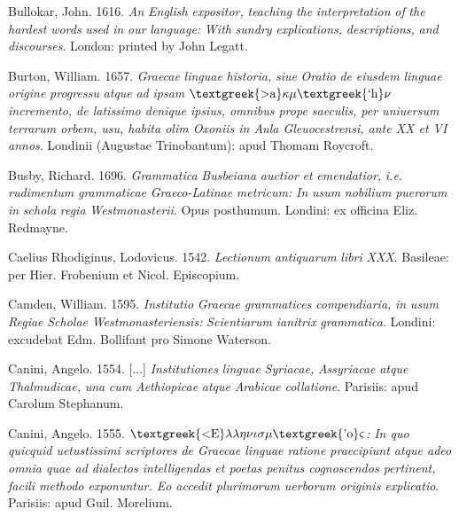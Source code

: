 Bullokar, John. 1616. \textit{An} \textit{English} \textit{expositor,} \textit{teaching} \textit{the} \textit{interpretation} \textit{of} \textit{the} \textit{hardest} \textit{words} \textit{used} \textit{in} \textit{our} \textit{language:} \textit{With} \textit{sundry} \textit{explications,} \textit{descriptions,} \textit{and} \textit{discourses}. London: printed by John Legatt.

Burton, William. 1657. \textit{Graecae} \textit{linguae} \textit{historia,} \textit{siue} \textit{Oratio} \textit{de} \textit{eiusdem} \textit{linguae} \textit{origine} \textit{progressu} \textit{atque} \textit{ad} \textit{ipsam} \textit{$\text{\textgreek{>a}}\kappa \mu \text{\textgreek{`h}}\nu $ incremento, de latissimo denique ipsius, omnibus prope saeculis, per uniuersum terrarum orbem, usu, habita olim Oxoniis in Aula Gleuocestrensi, ante XX et VI annos}. Londinii (Augustae Trinobantum): apud Thomam Roycroft.

Busby, Richard. 1696. \textit{Grammatica} \textit{Busbeiana} \textit{auctior} \textit{et} \textit{emendatior,} \textit{i.e.} \textit{rudimentum} \textit{grammaticae} \textit{Graeco-Latinae} \textit{metricum:} \textit{In} \textit{usum} \textit{nobilium} \textit{puerorum} \textit{in} \textit{schola} \textit{regia} \textit{Westmonasterii}. Opus posthumum. Londini: ex officina Eliz. Redmayne.

Caelius Rhodiginus, Lodovicus. 1542. \textit{Lectionum} \textit{antiquarum} \textit{libri} \textit{XXX}. Basileae: per Hier. Frobenium et Nicol. Episcopium.

Camden, William. 1595. \textit{Institutio} \textit{Graecae} \textit{grammatices} \textit{compendiaria,} \textit{in} \textit{usum} \textit{Regiae} \textit{Scholae} \textit{Westmonasteriensis:} \textit{Scientiarum} \textit{ianitrix} \textit{grammatica}. Londini: excudebat Edm. Bollifant pro Simone Waterson.

Canini, Angelo. 1554. [...] \textit{Institutiones} \textit{linguae} \textit{Syriacae,} \textit{Assyriacae} \textit{atque} \textit{Thalmudicae,} \textit{una} \textit{cum} \textit{Aethiopicae} \textit{atque} \textit{Arabicae} \textit{collatione}. Parisiis: apud Carolum Stephanum.

Canini, Angelo. 1555. \textit{$\text{\textgreek{<E}}\lambda \lambda \eta \nu \iota \sigma \mu \text{\textgreek{'o}}\varsigma $: In quo quicquid uetustissimi scriptores de Graecae linguae ratione praecipiunt atque adeo omnia quae ad dialectos intelligendas et poetas penitus cognoscendos pertinent, facili methodo exponuntur. Eo accedit plurimorum uerborum originis explicatio}. Parisiis: apud Guil. Morelium.

